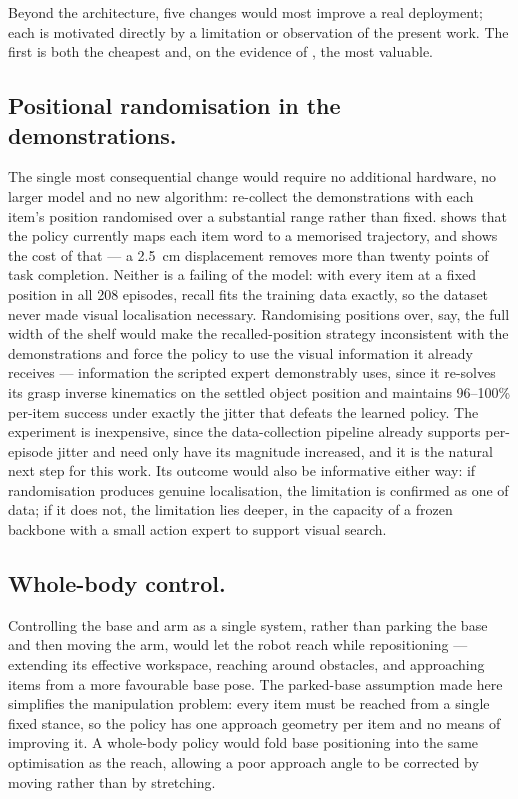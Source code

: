 Beyond the architecture, five changes would most improve a real deployment; each is
motivated directly by a limitation or observation of the present work. The first is
both the cheapest and, on the evidence of , the most valuable.

\subsection{Positional randomisation in the demonstrations.} The single most
consequential change would require no additional hardware, no larger model and no new
algorithm: re-collect the demonstrations with each item's position randomised over a
substantial range rather than fixed.  shows that the policy
currently maps each item word to a memorised trajectory, and
 shows the cost of that --- a \SI{2.5}{cm} displacement
removes more than twenty points of task completion. Neither is a failing of the model:
with every item at a fixed position in all 208 episodes, recall fits the training data
exactly, so the dataset never made visual localisation necessary. Randomising positions
over, say, the full width of the shelf would make the recalled-position strategy
inconsistent with the demonstrations and force the policy to use the visual information
it already receives --- information the scripted expert demonstrably uses, since it
re-solves its grasp inverse kinematics on the settled object position and maintains
96--100\% per-item success under exactly the jitter that defeats the learned policy.
The experiment is inexpensive, since the data-collection pipeline already supports
per-episode jitter and need only have its magnitude increased, and it is the natural
next step for this work. Its outcome would also be informative either way: if
randomisation produces genuine localisation, the limitation is confirmed as one of
data; if it does not, the limitation lies deeper, in the capacity of a frozen backbone
with a small action expert to support visual search.

\subsection{Whole-body control.} Controlling the base and arm as a single system,
rather than parking the base and then moving the arm, would let the robot reach while
repositioning --- extending its effective workspace, reaching around obstacles, and
approaching items from a more favourable base pose. The parked-base assumption made
here simplifies the manipulation problem: every item must be reached from a single
fixed stance, so the policy has one approach geometry per item and no means of
improving it. A whole-body policy would fold base positioning into the same
optimisation as the reach, allowing a poor approach angle to be corrected by moving
rather than by stretching.

